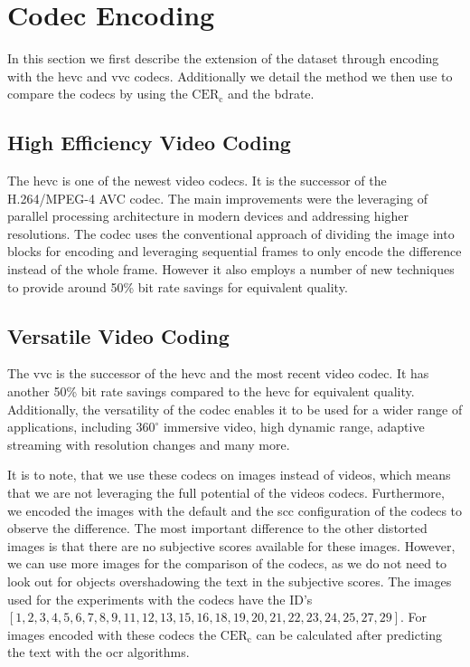 \section{Codec Encoding}
\label{sec:dataset_codec}

In this section we first describe the extension of the dataset through encoding with the \gls{hevc} and \gls{vvc} codecs.
Additionally we detail the method we then use to compare the codecs by using the $\text{CER}_{\text{c}}$ and the \gls{bdrate}.

\subsection{High Efficiency Video Coding}
\label{subsec:hevc}

The \gls{hevc} \cite{hevc_2012} is one of the newest video codecs.
It is the successor of the H.264/MPEG-4 AVC codec.
The main improvements were the leveraging of parallel processing architecture in modern devices and addressing higher resolutions.
The codec uses the conventional approach of dividing the image into blocks for encoding and leveraging sequential frames to only encode the difference instead of the whole frame.
However it also employs a number of new techniques to provide around 50\% bit rate savings for equivalent quality.

\subsection{Versatile Video Coding}
\label{subsec:vvc}

The \gls{vvc} \cite{vvc_2021} is the successor of the \gls{hevc} and the most recent video codec.
It has another 50\% bit rate savings compared to the \gls{hevc} for equivalent quality.
Additionally, the versatility of the codec enables it to be used for a wider range of applications, including $360^{\circ}$ immersive video, high dynamic range, adaptive streaming with resolution changes and many more.


It is to note, that we use these codecs on images instead of videos, which means that we are not leveraging the full potential of the videos codecs.
Furthermore, we encoded the images with the default and the \gls{scc} configuration of the codecs to observe the difference.
The most important difference to the other distorted images is that there are no subjective scores available for these images.
However, we can use more images for the comparison of the codecs, as we do not need to look out for objects overshadowing the text in the subjective scores.
The images used for the experiments with the codecs have the ID's $[1, 2, 3, 4, 5, 6, 7, 8, 9, 11, 12, 13, 15, 16, 18, 19, 20, 21, 22, 23, 24, 25, 27, 29]$.
For images encoded with these codecs the $\text{CER}_{\text{c}}$ can be calculated after predicting the text with the \gls{ocr} algorithms.

